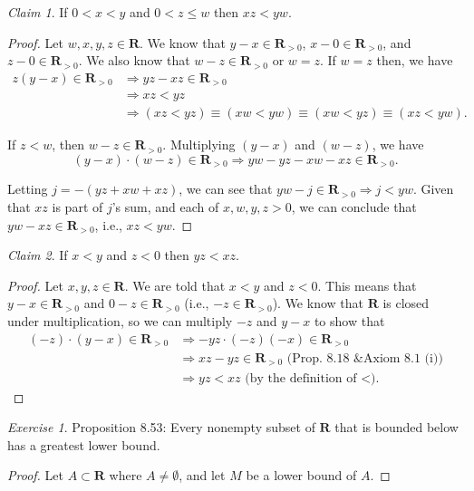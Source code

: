 \documentclass[12pt,oneside]{amsart}
\theoremstyle{remark}
\newtheorem{exer}{Exercise}
\newtheorem{claim}{Claim}[exer]
\newcommand{\bfR}{\mathbf{R}}
\begin{document}
\begin{claim}
If $0 < x < y$ and $0 < z \leq w$ then $xz < yw$.
\end{claim}
\begin{proof}
Let $w,x,y,z \in \bfR$. We know that $y - x \in \bfR_{>0}$, $x - 0 \in \bfR_{>0}$, and $z - 0 \in \bfR_{>0}$. We also know that $w - z \in \bfR_{>0}$ or $w = z$. If $w = z$ then, we have
\begin{equation}
\begin{split}
z(y - x) \in \bfR_{>0} &\Rightarrow yz - xz \in \bfR_{>0} \\
                       &\Rightarrow xz < yz \\
                       &\Rightarrow (xz < yz) \equiv (xw < yw) \equiv (xw < yz) \equiv (xz < yw).
\end{split}
\end{equation}

If $z < w$, then $w - z \in \bfR_{>0}$. Multiplying $(y - x)$ and $(w - z)$, we have
\[ (y - x) \cdot (w - z) \in \bfR_{>0} \Rightarrow yw - yz - xw - xz \in \bfR_{>0}. \]

Letting $j = -(yz + xw + xz)$, we can see that $yw - j \in \bfR_{>0} \Rightarrow j < yw$. Given that $xz$ is part of $j$'s sum, and each of $x,w,y,z > 0$, we can conclude that $yw - xz \in \bfR_{>0}$, i.e., $xz < yw$.
\end{proof}

\begin{claim}
If $x < y$ and $z < 0$ then $yz < xz$.
\end{claim}
\begin{proof}
Let $x,y,z \in \bfR$. We are told that $x < y$ and $z < 0$. This means that $y - x \in \bfR_{>0}$ and $0 - z \in \bfR_{>0}$ (i.e., $-z \in \bfR_{>0}$). We know that $\bfR$ is closed under multiplication, so we can multiply $-z$ and $y - x$ to show that
\begin{equation}
\begin{split}
(-z) \cdot (y - x) \in \bfR_{>0} &\Rightarrow -yz \cdot (-z)(-x) \in \bfR_{>0} \\
                                 &\Rightarrow xz - yz \in \bfR_{>0} \text{ (Prop. 8.18 \& Axiom 8.1 (i))} \\
                                 &\Rightarrow yz < xz \text{ (by the definition of <).}
\end{split}
\end{equation}
\end{proof}

%
%
%
%
\newpage
\begin{exer}
Proposition 8.53: Every nonempty subset of $\bfR$ that is bounded below has a greatest lower bound. %
\end{exer}

\begin{proof}
Let $A \subset \bfR$ where $A \neq \emptyset$, and let $M$ be a lower bound of $A$.
\end{proof}
\end{document}
